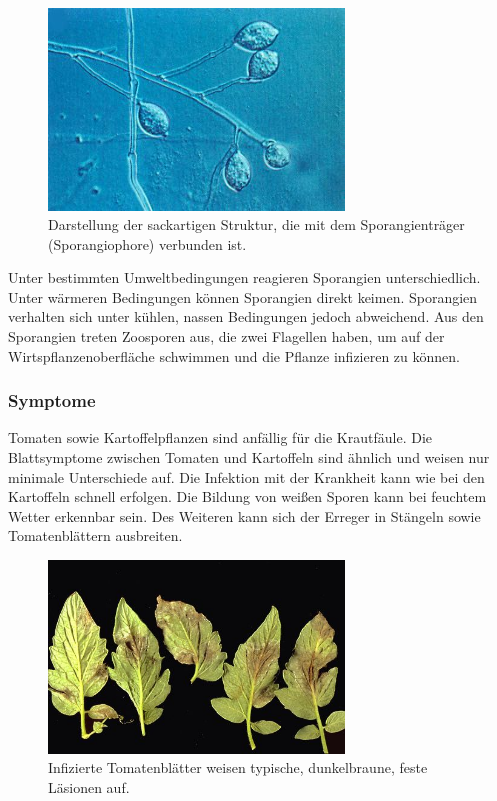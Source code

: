 \begin{figure}[h!]
	\centering
	\includegraphics[width=0.7\textwidth]{bilder/LateBlight15.jpg}
	\caption{Darstellung der sackartigen Struktur, die mit dem Sporangienträger (Sporangiophore) verbunden ist\cite{lbopat}.}
	\label{late_sack}
\end{figure}

Unter bestimmten Umweltbedingungen reagieren Sporangien unterschiedlich. Unter wärmeren Bedingungen können Sporangien direkt keimen. Sporangien verhalten sich unter kühlen, nassen Bedingungen jedoch abweichend. Aus den Sporangien treten Zoosporen aus, die zwei Flagellen haben, um auf der Wirtspflanzenoberfläche schwimmen und die Pflanze infizieren zu können\cite{lbopat}.


\subsubsection{Symptome}

Tomaten sowie Kartoffelpflanzen\cite{lbopat} sind anfällig für die Krautfäule. Die Blattsymptome zwischen Tomaten und Kartoffeln sind ähnlich und weisen nur minimale Unterschiede auf. Die Infektion mit der Krankheit kann wie bei den Kartoffeln schnell erfolgen. Die Bildung von weißen Sporen kann bei feuchtem Wetter erkennbar sein. Des Weiteren kann sich der Erreger in Stängeln sowie Tomatenblättern ausbreiten.

\begin{figure}[h!]
	\centering
	\includegraphics[width=0.7\textwidth]{bilder/LateBlight13.jpg}
	\caption{Infizierte Tomatenblätter weisen typische, dunkelbraune, feste Läsionen auf\cite{lbopat}.}
	\label{lateblight_leaves}
\end{figure}

